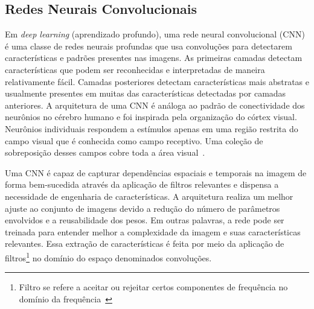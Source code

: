 \subsection{Redes Neurais Convolucionais}
Em \textit{deep learning} (aprendizado profundo), uma rede neural convolucional (\acrshort{CNN})~\cite{lecun2010convolutional} é uma classe de redes neurais profundas que usa convoluções para detectarem características e padrões presentes nas imagens. As primeiras camadas detectam características que podem ser reconhecidas e interpretadas de maneira relativamente fácil. Camadas posteriores detectam características mais abstratas e usualmente presentes em muitas das características detectadas por camadas anteriores. A arquitetura de uma \acrshort{CNN} é análoga ao padrão de conectividade dos neurônios no cérebro humano e foi inspirada pela organização do córtex visual. Neurônios individuais respondem a estímulos apenas em uma região restrita do campo visual que é conhecida como campo receptivo. Uma coleção de sobreposição desses campos cobre toda a área visual~\cite{livrodl}.


Uma \acrshort{CNN} é capaz de capturar dependências espaciais e temporais na imagem de forma bem-sucedida através da aplicação de filtros relevantes e dispensa a necessidade de engenharia de características. A arquitetura realiza um melhor ajuste ao conjunto de imagens devido a redução do número de parâmetros envolvidos e a reusabilidade dos pesos. Em outras palavras, a rede pode ser treinada para entender melhor a complexidade da imagem e suas características relevantes. Essa extração de características é feita por meio da aplicação de filtros\footnote{Filtro se refere a aceitar ou rejeitar certos componentes de frequência no domínio da frequência~\cite{}} no domínio do espaço denominados convoluções. 
